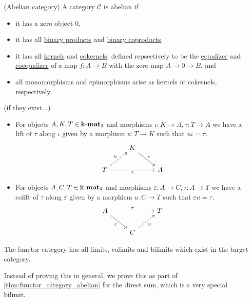 \begin{definition}{(Abelian category)}
A category $\mathcal{C}$ is \ul{abelian} if
\begin{itemize}
\item it has a zero object $0$,
\item it has all \ul{binary products} and \ul{binary coproducts},
\item it has all \ul{kernels} and \ul{cokernels}, defined repsectively to be the \ul{equalizer} and
\ul{coequalizer} of a map $f : A \rightarrow B$ with the zero map $A \rightarrow 0 \rightarrow B$, and
\item all monomorphisms and epimorphisms arise as kernels or cokernels, respectively.
\end{itemize}
\end{definition}

\begin{definition}
(if they exist...)
\begin{itemize}
\item For objects $A, K, T \in \Bbbk\textnormal{-}\mathbf{mat}_{0}$ and morphisms $\iota : K \rightarrow A, \tau : T \rightarrow A$ we have a lift of $\tau$ along $\iota$
given by a morphism $u : T \rightarrow K$ such that $u \iota = \tau$.
\[
\begin{tikzcd}
                                              & K \arrow[rd, "\iota"] &   \\
T \arrow[rr, "\tau"'] \arrow[ru, "u", dashed] &                       & A
\end{tikzcd}
\]
\item For objects $A,C,T \in \Bbbk\textnormal{-}\mathbf{mat}_{0}$ and morphisms $\varepsilon : A \rightarrow C, \tau : A \rightarrow T$ we have a colift of $\tau$ along
$\varepsilon$ given by a morphism $u : C \rightarrow T$ such that $\varepsilon u = \tau$.
\[
\begin{tikzcd}
A \arrow[rr, "\tau"] \arrow[rd, "\varepsilon"'] &                            & T \\
                                                & C \arrow[ru, "u"', dashed] &  
\end{tikzcd}
\]
\end{itemize}
\end{definition}


\begin{theorem}
The functor category has all limits, colimits and bilimits which exist in the target category.
\end{theorem}

Instead of proving this in general, we prove this as part of \ref{thm:functor_category_abelian} for the direct sum, which is a very special bilimit.

